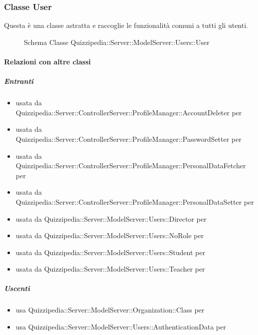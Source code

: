 \subsubsection{Classe User}
Questa è una classe astratta e raccoglie le funzionalità comuni a tutti gli utenti.
\begin{figure}[H]
\centering
\noindent{}
\caption[Schema Classe User]{Schema Classe Quizzipedia::Server::ModelServer::Users::User}
\end{figure}
\paragraph{Relazioni con altre classi}
\subparagraph{Entranti}
\begin{itemize}
\item usata da Quizzipedia::Server::ControllerServer::ProfileManager::AccountDeleter per 
\item usata da Quizzipedia::Server::ControllerServer::ProfileManager::PasswordSetter per 
\item usata da Quizzipedia::Server::ControllerServer::ProfileManager::PersonalDataFetcher per 
\item usata da Quizzipedia::Server::ControllerServer::ProfileManager::PersonalDataSetter per 
\item usata da Quizzipedia::Server::ModelServer::Users::Director per 
\item usata da Quizzipedia::Server::ModelServer::Users::NoRole per 
\item usata da Quizzipedia::Server::ModelServer::Users::Student per 
\item usata da Quizzipedia::Server::ModelServer::Users::Teacher per 
\end{itemize}
\subparagraph{Uscenti}
\begin{itemize}
\item usa Quizzipedia::Server::ModelServer::Organization::Class per 
\item usa Quizzipedia::Server::ModelServer::Users::AuthenticationData per 
\end{itemize}
